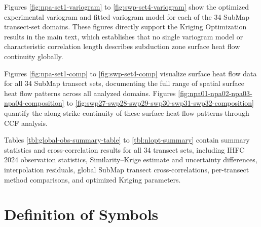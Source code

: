 \documentclass[final]{agujournal2019}
\begin{document}
Figures \ref{fig:npa-set1-variogram} to \ref{fig:swp-set4-variogram}
show the optimized experimental variogram and fitted variogram model for
each of the 34 SubMap transect-set domains. These figures directly
support the Kriging Optimization results in the main text, which
establishes that no single variogram model or characteristic correlation
length describes subduction zone surface heat flow continuity globally.

Figures \ref{fig:npa-set1-comp} to \ref{fig:swp-set4-comp} visualize
surface heat flow data for all 34 SubMap transect sets, documenting the
full range of spatial surface heat flow patterns across all analyzed
domains. Figures \ref{fig:npa01-npa02-npa03-npa04-composition} to
\ref{fig:swp27-swp28-swp29-swp30-swp31-swp32-composition} quantify the
along-strike continuity of these surface heat flow patterns through CCF
analysis.

Tables \ref{tbl:global-obs-summary-table} to \ref{tbl:nlopt-summary}
contain summary statistics and cross-correlation results for all 34
transect sets, including IHFC 2024 observation statistics,
Similarity--Krige estimate and uncertainty differences, interpolation
residuals, global SubMap transect cross-correlations, per-transect
method comparisons, and optimized Kriging parameters.

\clearpage

\section*{Definition of Symbols}\label{sec:symbols}
\end{document}
